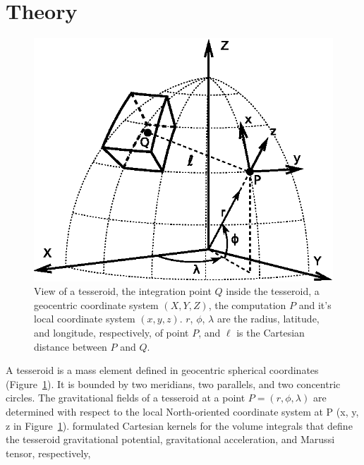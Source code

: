 \documentclass[manuscript,endfloat]{geophysics}
\begin{document}
\section{Theory}


\begin{figure}
    \centering
    \includegraphics{figs/tesseroid}
    \caption{
        View of a tesseroid,
        the integration point $Q$ inside the tesseroid,
        a geocentric coordinate system $(X, Y, Z)$,
        the computation $P$ and it's local coordinate system $(x, y, z)$.
        $r$, $\phi$, $\lambda$ are
        the radius, latitude, and longitude, respectively, of point $P$,
        and $\ell$ is the Cartesian distance between $P$ and $Q$.
    }
    \label{fig:tesseroid}
\end{figure}

A tesseroid is a mass element defined in geocentric spherical
coordinates
(Figure~\ref{fig:tesseroid}).
It is bounded by two meridians, two parallels, and two concentric circles.
The gravitational fields of a tesseroid at a point $P = (r,\phi,\lambda)$
are determined with respect to the local North-oriented coordinate system at
P (x, y, z in Figure~\ref{fig:tesseroid}).
\citet{Grombein2013} formulated Cartesian kernels for the volume integrals
that define the tesseroid gravitational potential, gravitational acceleration,
and Marussi tensor, respectively,
\end{document}
